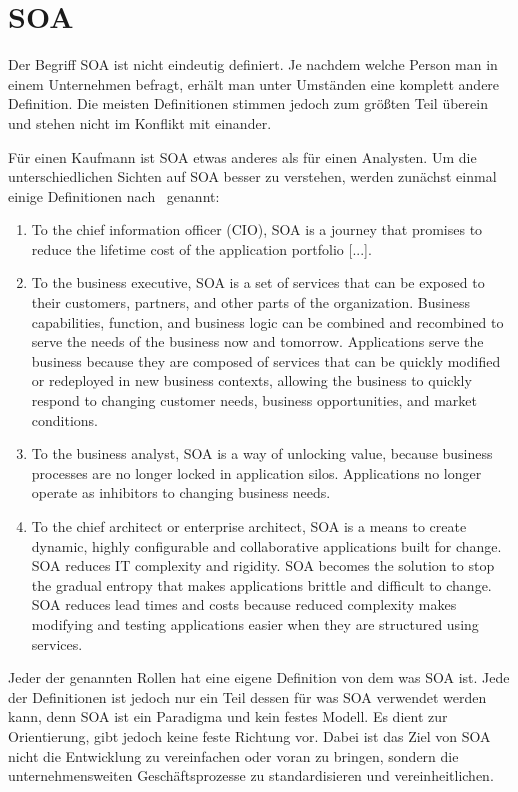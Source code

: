 \chapter{SOA}
\label{chap:soa}
Der Begriff SOA ist nicht eindeutig definiert. Je nachdem welche Person man in einem Unternehmen befragt, erhält man unter Umständen eine komplett andere Definition. \frqq Die meisten Definitionen stimmen jedoch zum größten Teil überein und stehen nicht im Konflikt mit einander.\flqq\cite[vgl. Seite 6]{100QA}

Für einen Kaufmann ist SOA etwas anderes als für einen Analysten. Um die unterschiedlichen Sichten auf SOA besser zu verstehen, werden zunächst einmal einige Definitionen nach \cite{100QA}\ genannt:
\begin{enumerate}
       \item \frqq To the chief information officer (CIO), SOA is a journey that
       promises to reduce the lifetime cost of the application portfolio [...].\flqq \cite[vgl. Seite 6]{100QA}
    
       \item \frqq To the business executive, SOA is a set of services that can be exposed to their customers, partners, and other parts of the organization. Business capabilities, function, and business logic can be combined and recombined to serve the needs of the business now and tomorrow. Applications serve the business because they are composed
       of services that can be quickly modified or redeployed in new
       business contexts, allowing the business to quickly respond to changing
       customer needs, business opportunities, and market conditions.\flqq \cite[vgl. Seite 6]{100QA}
       
       \item \frqq To the business analyst, SOA is a way of unlocking value, because business processes are no longer locked in application silos. Applications no longer operate as inhibitors to changing business needs.\flqq \cite[vgl. Seite 6]{100QA}
       
       \item \frqq To the chief architect or enterprise architect, SOA is a means to
       create dynamic, highly configurable and collaborative applications
       built for change. SOA reduces IT complexity and rigidity. SOA becomes the solution to stop the gradual entropy that makes applications
       brittle and difficult to change. SOA reduces lead times and costs
       because reduced complexity makes modifying and testing applications
       easier when they are structured using services.\flqq \cite[vgl. Seite ]{100QA}
\end{enumerate}
Jeder der genannten Rollen hat eine eigene Definition von dem was SOA ist. Jede der Definitionen ist jedoch nur ein Teil dessen für was SOA verwendet werden kann, denn SOA ist ein Paradigma und kein festes Modell. Es dient zur Orientierung, gibt jedoch keine feste Richtung vor. Dabei ist das Ziel von SOA nicht die Entwicklung zu vereinfachen oder voran zu bringen, sondern die unternehmensweiten Geschäftsprozesse zu standardisieren und vereinheitlichen.

